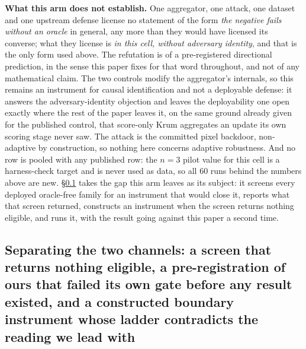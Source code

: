 \documentclass{article}
\begin{document}
\textbf{What this arm does not establish.} One aggregator, one attack, one dataset and one upstream defense license no statement of the form \emph{the negative fails without an oracle} in general, any more than they would have licensed its converse; what they license is \emph{in this cell, without adversary identity}, and that is the only form used above. The refutation is of a pre-registered directional prediction, in the sense this paper fixes for that word throughout, and not of any mathematical claim. The two controls modify the aggregator's internals, so this remains an instrument for causal identification and not a deployable defense: it answers the adversary-identity objection and leaves the deployability one open exactly where the rest of the paper leaves it, on the same ground already given for the published control, that score-only Krum aggregates an update its own scoring stage never saw. The attack is the committed pixel backdoor, non-adaptive by construction, so nothing here concerns adaptive robustness. And no row is pooled with any published row: the $n{=}3$ pilot value for this cell is a harness-check target and is never used as data, so all $60$ runs behind the numbers above are new. §\ref{app:channel_separation} takes the gap this arm leaves as its subject: it screens every deployed oracle-free family for an instrument that would close it, reports what that screen returned, constructs an instrument when the screen returns nothing eligible, and runs it, with the result going against this paper a second time.

\subsection{Separating the two channels: a screen that returns nothing eligible, a pre-registration of ours that failed its own gate before any result existed, and a constructed boundary instrument whose ladder contradicts the reading we lead with}
\label{app:channel_separation}
\end{document}
